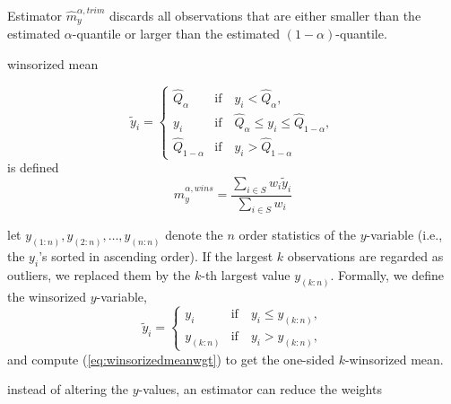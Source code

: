 \documentclass[a4paper,11pt]{scrreprt}
\begin{document}
Estimator $\widehat{m}_y^{\alpha, trim}$ discards all observations that are either smaller than the estimated $\alpha$-quantile or larger than the estimated $(1-\alpha)$-quantile. 

winsorized mean

\begin{equation*}
   \tilde{y}_i = \begin{cases} 
      \widehat{Q}_{\alpha} & \text{if} \quad y_i < \widehat{Q}_{\alpha}, \\
      y_i & \text{if} \quad \widehat{Q}_{\alpha} \leq y_i \leq \widehat{Q}_{1-\alpha}, \\
      \widehat{Q}_{1-\alpha} & \text{if} \quad y_i > \widehat{Q}_{1-\alpha}
   \end{cases}
\end{equation*}
\noindent is defined 
\begin{equation}\label{eq:winsorizedmeanwgt}
   \widehat{m}_y^{\alpha, wins} = \frac{\sum_{i \in S}w_i \tilde{y}_i}{\sum_{i \in S} w_i} 
\end{equation}

 let $y_{(1:n)}, y_{(2:n)}, \ldots, y_{(n:n)}$ denote the $n$ order statistics of the $y$-variable (i.e., the $y_i$'s sorted in ascending order). If the largest $k$ observations are regarded as outliers, we replaced them by the $k$-th largest value $y_{(k:n)}$. Formally, we define the winsorized $y$-variable, 
\begin{equation*}
   \tilde{y}_i = \begin{cases} 
      y_i & \text{if} \quad  y_i \leq y_{(k:n)}, \\
      y_{(k:n)} & \text{if} \quad y_i > y_{(k:n)},
   \end{cases}
\end{equation*}
\noindent and compute (\ref{eq:winsorizedmeanwgt}) to get the one-sided $k$-winsorized mean.


instead of altering the $y$-values, an estimator can reduce the weights 

\end{document}
